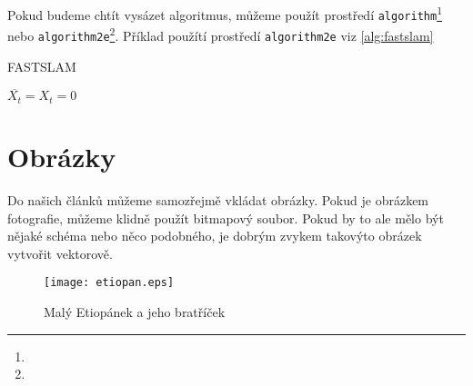 \documentclass[a4paper,11pt]{article}
\begin{document}
Pokud budeme chtít vysázet algoritmus, můžeme použít prostředí \verb|algorithm|\footnote{} nebo \verb|algorithm2e|\footnote{}.
Příklad použítí prostředí \verb|algorithm2e| viz \ref{alg:fastslam}

\begin{algorithm}
    \caption{F{\footnotesize AST}SLAM}
    \label{alg:fastslam}
    \vspace{0.5em}
    $\overline{X_t} = X_t = 0$\;


\end{algorithm}

\section{Obrázky}
Do našich článků můžeme samozřejmě vkládat obrázky. Pokud je obrázkem fotografie, můžeme klidně použít bitmapový soubor.
Pokud by to ale mělo být nějaké schéma nebo něco podobného, je dobrým zvykem takovýto obrázek vytvořit vektorově.

\begin{figure}[!ht]
    \centering
    \texttt{[image: etiopan.eps]}
    \caption{Malý Etiopánek a jeho bratříček}
\end{figure}
\end{document}
